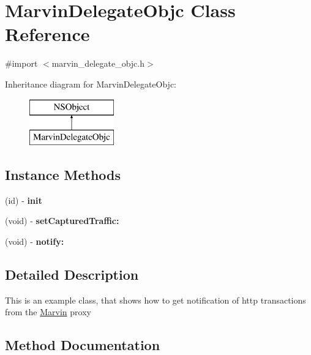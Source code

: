 \hypertarget{interface_marvin_delegate_objc}{}\section{Marvin\+Delegate\+Objc Class Reference}
\label{interface_marvin_delegate_objc}


{\ttfamily \#import $<$marvin\+\_\+delegate\+\_\+objc.\+h$>$}

Inheritance diagram for Marvin\+Delegate\+Objc\+:\begin{figure}[H]
\begin{center}
\leavevmode
\includegraphics[height=2.000000cm]{interface_marvin_delegate_objc}
\end{center}
\end{figure}
\subsection*{Instance Methods}
\begin{DoxyCompactItemize}
\item 
(id) -\/ {\bfseries init}
\item 
\mbox{\label{interface_marvin_delegate_objc_a4cc278c4868c917f1cc99d050bfad22e}} 
(void) -\/ {\bfseries set\+Captured\+Traffic\+:}
\item 
\mbox{\label{interface_marvin_delegate_objc_a24f5f03152b92b30ed617b8552c26933}} 
(void) -\/ {\bfseries notify\+:}
\end{DoxyCompactItemize}


\subsection{Detailed Description}
This is an example class, that shows how to get notification of http transactions from the \hyperlink{namespace_marvin}{Marvin} proxy 

\subsection{Method Documentation}
\mbox{\label{interface_marvin_delegate_objc_a6e02c2ba9e32968e72046c6f538d310f}} 
